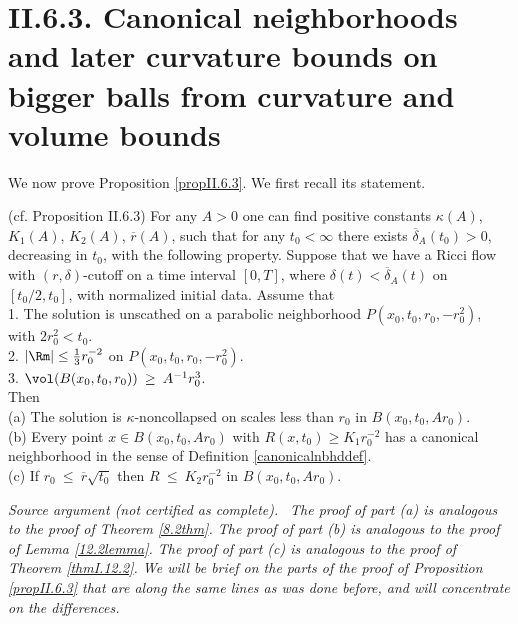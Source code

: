 \section{II.6.3. Canonical neighborhoods and later curvature bounds on bigger balls from
curvature and volume bounds}
We now prove Proposition \ref{propII.6.3}.
We first recall its statement.
\begin{proposition}
  \label{prop:kl-canonical-neighborhoods-later-curvature-bounds-bigger-balls-from-curvatu-existence-canonical-neighborhoods}

(cf. Proposition II.6.3)
For any $A > 0$ one can find positive constants $\kappa(A)$, $K_1(A)$, $K_2(A)$,
$\overline{r}(A)$,
such that for any $t_0 < \infty$
there exists $\overline{\delta}_{A}(t_0)
> 0$, decreasing in $t_0$, with the following property.  Suppose that
we have a Ricci flow with $(r, \delta)$-cutoff on a time interval
$[0, T]$, where $\delta(t) < \overline{\delta}_A(t)$ on $[t_0/2, t_0]$, with
normalized initial data.  Assume that \\
1. The solution is unscathed on a parabolic neighborhood
$P(x_0, t_0, r_0, -r_0^2)$, with $2r_0^2 < t_0$. \\
2.
$|\Rm| \le \frac13 r_0^{-2}$
on $P(x_0, t_0, r_0, -r_0^2)$. \\
3. $\vol(B(x_0, t_0, r_0)) \: \ge \: A^{-1} r_0^3$.\\

Then\\
(a) The solution is $\kappa$-noncollapsed on scales less than $r_0$
in $B(x_0, t_0, Ar_0)$.\\
(b) Every point $x \in B(x_0, t_0, Ar_0)$ with $R(x, t_0) \ge K_1 r_0^{-2}$
has a canonical neighborhood in the sense of
Definition \ref{canonicalnbhddef}.\\
(c) If $r_0 \: \le \: \overline{r} \sqrt{t_0}$ then $R \: \le \: K_2
r_0^{-2}$ in $B(x_0, t_0, Ar_0)$.
\end{proposition}
\par\medskip\noindent\textit{Source argument (not certified as complete).}\ \begingroup\itshape
The proof of part (a) is analogous to the proof of
Theorem \ref{8.2thm}. The proof of part (b) is analogous to
the proof of Lemma \ref{12.2lemma}. The proof of part (c) is analogous
to the proof of Theorem \ref{thmI.12.2}.
We will be brief on the parts of the proof of Proposition \ref{propII.6.3}
that are along the same lines as was done before, and will
concentrate on the differences.


